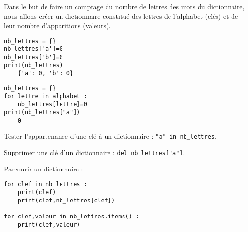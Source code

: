 \begin{exemple}%
Dans le but de faire un comptage du nombre de lettres des mots du dictionnaire, nous allons créer un dictionnaire constitué des lettres de l'alphabet (clés) et de leur nombre d'apparitions (valeurs). 
~\\

\begin{minipage}[c]{.45\linewidth}
\begin{lstlisting}
nb_lettres = {}
nb_lettres['a']=0
nb_lettres['b']=0
print(nb_lettres)
    {'a': 0, 'b': 0}
\end{lstlisting}
\end{minipage}
\hfill
\begin{minipage}[c]{.45\linewidth}
\begin{lstlisting}
nb_lettres = {}
for lettre in alphabet :
    nb_lettres[lettre]=0
print(nb_lettres["a"])
    0
\end{lstlisting}

\end{minipage}

Tester l'appartenance d'une clé à un dictionnaire : \texttt{"a" in nb\_lettres}.

Supprimer une clé d'un dictionnaire : \texttt{del nb\_lettres["a"]}.

Parcourir un dictionnaire : 
\begin{lstlisting}
for clef in nb_lettres :
    print(clef)
    print(clef,nb_lettres[clef])

for clef,valeur in nb_lettres.items() :
    print(clef,valeur)
\end{lstlisting}
\end{exemple}


%
%
%
%
%
%
%
%
%
%
%
